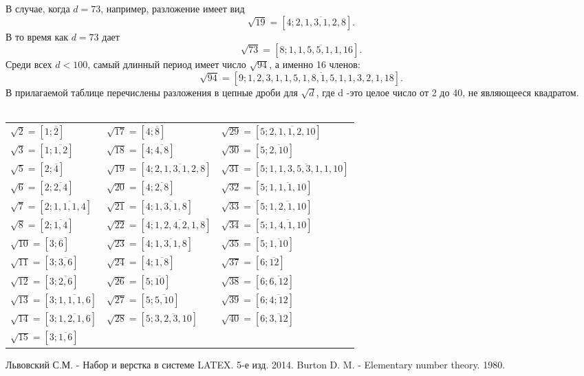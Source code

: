 \documentclass[twoside,12pt]{article}
\begin{document}
\noindent В случае, когда $d = 73$, например, разложение имеет вид
$$\sqrt{19} = [4; \overline{2,1,3,1,2,8}]. $$
\noindent В то время как $d = 73$ дает
$$\sqrt{73} = [8;\overline{1,1,5,5,1,1,16}].$$
\noindent Среди всех $d<100$, самый длинный период имеет число $\sqrt{94}$, а именно 16 членов:
$$\sqrt{94} = [9;\overline{1,2,3,1,1,5,1,8,1,5,1,1,3,2,1,18}].$$
\indent В прилагаемой таблице перечислены разложения в цепные дроби для $\sqrt{d}$, где d -это целое число от 2 до 40, не являющееся квадратом.\\ \\
\begin{center}
\begin{tabular}{ l l l }
	$\sqrt{2} = [1;\overline{2}]$ & $\sqrt{17} = [4;\overline{8}]$ & $\sqrt{29} = [5;\overline{2,1,1,2,10}]$ \\
	$\sqrt{3} = [1;\overline{1,2}]$ & $\sqrt{18} = [4;\overline{4,8}]$ & $\sqrt{30} = [5;\overline{2,10}]$\\
	$\sqrt{5} = [2;\overline{4}]$ & $\sqrt{19} = [4;\overline{2,1,3,1,2,8}]$ & $\sqrt{31} = [5;\overline{1,1,3,5,3,1,1,10}]$ \\
	$\sqrt{6} = [2;\overline{2,4}]$ & $\sqrt{20} = [4;\overline{2,8}]$ & $\sqrt{32} = [5;\overline{1,1,1,10}]$ \\
	$\sqrt{7} = [2;\overline{1,1,1,4}]$ & $\sqrt{21} = [4;\overline{1,3,1,8}]$ & $\sqrt{33} = [5;\overline{1,2,1,10}]$\\
	$\sqrt{8} = [2;\overline{1,4}]$ & $\sqrt{22} = [4;\overline{1,2,4,2,1,8}]$ & $\sqrt{34} = [5;\overline{1,4,1,10}]$ \\
	$\sqrt{10} = [3;\overline{6}]$ & $\sqrt{23} = [4;\overline{1,3,1,8}]$ & $\sqrt{35} = [5;\overline{1,10}]$\\
	$\sqrt{11} = [3;\overline{3,6}]$ & $\sqrt{24} = [4;\overline{1,8}]$ & $\sqrt{37} = [6;\overline{12}]$ \\
	$\sqrt{12} = [3;\overline{2,6}]$ & $\sqrt{26} = [5;\overline{10}]$ & $\sqrt{38} = [6;\overline{6,12}]$ \\
	$\sqrt{13} = [3;\overline{1,1,1,6}]$ & $\sqrt{27} = [5;\overline{5,10}]$ & $\sqrt{39} = [6;\overline{4;12}]$ \\
	$\sqrt{14} = [3;\overline{1,2,1,6}]$ & $\sqrt{28} = [5;\overline{3,2,3,10}]$ & $\sqrt{40} = [6;\overline{3,12}]$ \\
	$\sqrt{15} = [3;\overline{1,6}]$
\end{tabular}
\end{center}
\newpage
\begin{thebibliography}{3}
	Львовский С.М. - Набор и верстка в системе LATEX. 5-е изд. 2014.
	Burton D. M. - Elementary number theory. 1980.
\end{thebibliography}
	
\end{document}
